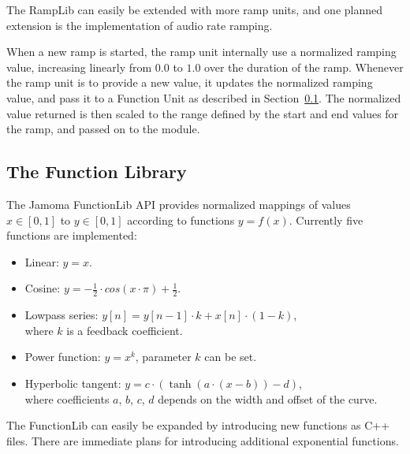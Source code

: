 \documentclass{article}
\begin{document}
The RampLib can easily be extended with more ramp units, and one planned extension is the implementation of audio rate ramping.

When a new ramp is started, the ramp unit internally use a normalized ramping value, increasing linearly from $0.0$ to $1.0$ over the duration of the ramp. Whenever the ramp unit is to provide a new value, it updates the normalized ramping value, and pass it to a Function Unit as described in Section~\ref{ssec:functionlib}. The normalized value returned is then scaled to the range defined by the start and end values for the ramp, and passed on to the module.



\subsection{The Function Library} %
\label{ssec:functionlib}

The Jamoma FunctionLib API provides normalized mappings of values $x \in [0,1]$ to $y \in [0,1]$ according to functions $y = f(x)$. Currently five functions are implemented: 

\begin{itemize}
	\item Linear: $y = x$.
	\item Cosine: $y = - \frac{1}{2} \cdot cos(x \cdot \pi ) + \frac{1}{2} $.
	\item Lowpass series: $y[n] = y[n-1] \cdot k + x[n] \cdot (1-k)$, \\ where $k$ is a feedback coefficient.
	\item Power function: $ y = x^{k} $, parameter $k$ can be set.
	\item Hyperbolic tangent: $ y = c \cdot (\tanh(a\cdot(x-b)) - d) $, \\ where coefficients $a$, $b$, $c$, $d$ depends on the width and offset of the curve.
\end{itemize}

The FunctionLib can easily be expanded by introducing new functions as C++ files. There are immediate plans for introducing additional exponential functions.
 
\end{document}
